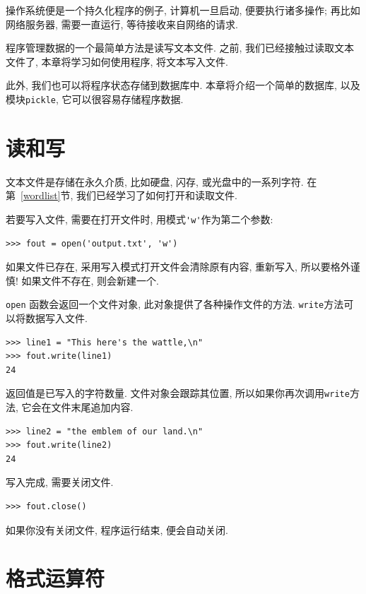 \documentclass[10pt]{book}
\begin{document}
操作系统便是一个持久化程序的例子, 计算机一旦启动, 便要执行诸多操作;
再比如网络服务器, 需要一直运行, 等待接收来自网络的请求. 

程序管理数据的一个最简单方法是读写文本文件. 
之前, 我们已经接触过读取文本文件了, 
本章将学习如何使用程序, 将文本写入文件. 

此外, 我们也可以将程序状态存储到数据库中. 
本章将介绍一个简单的数据库, 以及模块{\tt pickle}, 
它可以很容易存储程序数据. 


\section{读和写}

文本文件是存储在永久介质, 比如硬盘, 闪存, 或光盘中的一系列字符. 
在第~\ref{wordlist}节, 我们已经学习了如何打开和读取文件. 

若要写入文件, 需要在打开文件时, 用模式\verb"'w'"作为第二个参数:

\begin{verbatim}
>>> fout = open('output.txt', 'w')
\end{verbatim}
%
如果文件已存在, 采用写入模式打开文件会清除原有内容, 重新写入, 所以要格外谨慎!
如果文件不存在, 则会新建一个. 

{\tt open} 函数会返回一个文件对象, 此对象提供了各种操作文件的方法. 
{\tt write}方法可以将数据写入文件. 

\begin{verbatim}
>>> line1 = "This here's the wattle,\n"
>>> fout.write(line1)
24
\end{verbatim}
%

返回值是已写入的字符数量. 
文件对象会跟踪其位置, 所以如果你再次调用{\tt write}方法, 
它会在文件末尾追加内容. 

\begin{verbatim}
>>> line2 = "the emblem of our land.\n"
>>> fout.write(line2)
24
\end{verbatim}
%
写入完成, 需要关闭文件. 

\begin{verbatim}
>>> fout.close()
\end{verbatim}
%
%
如果你没有关闭文件, 程序运行结束, 便会自动关闭. 


\section{格式运算符}
\end{document}
